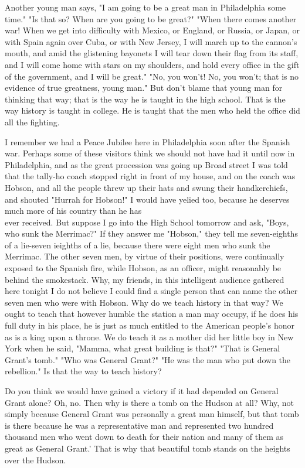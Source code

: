 \documentclass[10pt]{article}
\begin{document}
Another young man says, "I am going to be a great man in Philadelphia some time." "Is that so? When are you going to be great?" "When there comes another war! When we get into difficulty with Mexico, or England, or Russia, or Japan, or with Spain again over Cuba, or with New Jersey, I will march up to the cannon's mouth, and amid the glistening bayonets I will tear down their flag from its staff, and I will come home with stars on my shoulders, and hold every office in the gift of the government, and I will be great." "No, you won't! No, you won't; that is no evidence of true greatness, young man." But don't blame that young man for thinking that way; that is the way he is taught in the high school. That is the way history is taught in college. He is taught that the men who held the office did all the fighting.

I remember we had a Peace Jubilee here in Philadelphia soon after the Spanish war. Perhaps some of these visitors think we should not have had it until now in Philadelphia, and as the great procession was going up Broad street I was told that the tally-ho coach stopped right in front of my house, and on the coach was Hobson, and all the people threw up their hats and swung their handkerchiefs, and shouted "Hurrah for Hobson!" I would have yelied too, because he deserves much more of his country than he has\\
ever received. But suppose I go into the High School tomorrow and ask, "Boys, who sunk the Merrimac?" If they answer me "Hobson," they tell me seven-eighths of a lie-seven ieighths of a lie, because there were eight men who sunk the Merrimac. The other seven men, by virtue of their positions, were continually exposed to the Spanish fire, while Hobson, as an officer, might reasonably be behind the smokestack. Why, my friends, in this intelligent audience gathered here tonight I do not believe I could find a single person that can name the other seven men who were with Hobson. Why do we teach history in that way? We ought to teach that however humble the station a man may occupy, if he does his full duty in his place, he is just as much entitled to the American people's honor as is a king upon a throne. We do teach it as a mother did her little boy in New York when he said, "Mamma, what great building is that?" "That is General Grant's tomb." "Who was General Grant?" "He was the man who put down the rebellion." Is that the way to teach history?

Do you think we would have gained a victory if it had depended on General Grant alone? Oh, no. Then why is there a tomb on the Hudson at all? Why, not simply because General Grant was personally a great man himself, but that tomb is there because he was a representative man and represented two hundred thousand men who went down to death for their nation and many of them as great as General Grant.' That is why that beautiful tomb stands on the heights over the Hudson.
\end{document}
